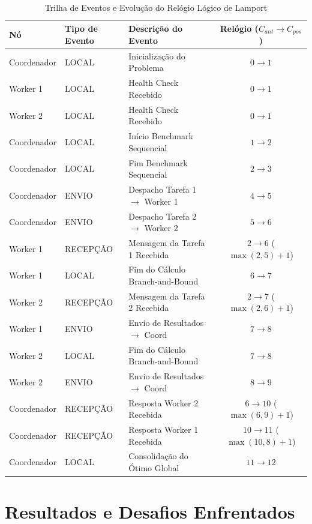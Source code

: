 \documentclass[12pt]{article}
\begin{document}
\begin{table}[htbp]
\centering
\caption{Trilha de Eventos e Evolução do Relógio Lógico de Lamport}
\label{tab:lamport}
\footnotesize
\begin{tabular}{@{}lllc@{}}
\toprule
\textbf{Nó} & \textbf{Tipo de Evento} & \textbf{Descrição do Evento} & \textbf{Relógio ($C_{ant} \to C_{pos}$)} \\ \midrule
Coordenador & LOCAL   & Inicialização do Problema          & $0 \to 1$ \\
Worker 1    & LOCAL   & Health Check Recebido              & $0 \to 1$ \\
Worker 2    & LOCAL   & Health Check Recebido              & $0 \to 1$ \\
Coordenador & LOCAL   & Início Benchmark Sequencial        & $1 \to 2$ \\
Coordenador & LOCAL   & Fim Benchmark Sequencial           & $2 \to 3$ \\
Coordenador & ENVIO   & Despacho Tarefa 1 $\to$ Worker 1   & $4 \to 5$ \\
Coordenador & ENVIO   & Despacho Tarefa 2 $\to$ Worker 2   & $5 \to 6$ \\
Worker 1    & RECEPÇÃO& Mensagem da Tarefa 1 Recebida     & $2 \to 6$ ($\max(2, 5)+1$) \\
Worker 1    & LOCAL   & Fim do Cálculo Branch-and-Bound    & $6 \to 7$ \\
Worker 2    & RECEPÇÃO& Mensagem da Tarefa 2 Recebida     & $2 \to 7$ ($\max(2, 6)+1$) \\
Worker 1    & ENVIO   & Envio de Resultados $\to$ Coord    & $7 \to 8$ \\
Worker 2    & LOCAL   & Fim do Cálculo Branch-and-Bound    & $7 \to 8$ \\
Worker 2    & ENVIO   & Envio de Resultados $\to$ Coord    & $8 \to 9$ \\
Coordenador & RECEPÇÃO& Resposta Worker 2 Recebida         & $6 \to 10$ ($\max(6, 9)+1$) \\
Coordenador & RECEPÇÃO& Resposta Worker 1 Recebida         & $10 \to 11$ ($\max(10, 8)+1$) \\
Coordenador & LOCAL   & Consolidação do Ótimo Global       & $11 \to 12$ \\ \bottomrule
\end{tabular}
\end{table}

\section{Resultados e Desafios Enfrentados}
\end{document}
